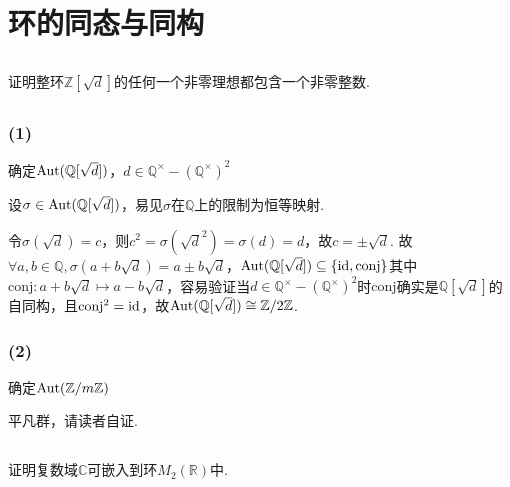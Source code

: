 \section{环的同态与同构}
\subsection{}
证明整环$\mathbb{Z}[\sqrt{d}]$的任何一个非零理想都包含一个非零整数.


\subsection{}
\subsubsection{(1)}
确定$\operatorname{Aut}(\mathbb{Q}[\sqrt{d}])$，$d\in\mathbb{Q}^{\times}-(\mathbb{Q}^{\times})^2$

\jie 设$\sigma\in\operatorname{Aut}(\mathbb{Q}[\sqrt{d}])$，易见$\sigma$在$\mathbb{Q}$上的限制为恒等映射.

令$\sigma(\sqrt{d})=c$，则$c^2=\sigma(\sqrt{d}^2)=\sigma(d)=d$，故$c=\pm \sqrt{d}$. 故$\forall a,b\in\mathbb{Q}, \sigma(a+b\sqrt{d})=a\pm b\sqrt{d}$，$\operatorname{Aut}(\mathbb{Q}[\sqrt{d}])\subseteq\{\operatorname{id}, \mathrm{conj}\}$其中$\mathrm{conj}: a+b\sqrt{d}\mapsto a-b\sqrt{d}$，容易验证当$d\in\mathbb{Q}^{\times}-(\mathbb{Q}^{\times})^2$时$\mathrm{conj}$确实是$\mathbb{Q}[\sqrt{d}]$的自同构，且$\mathrm{conj}^2=\operatorname{id}$，故$\operatorname{Aut}(\mathbb{Q}[\sqrt{d}])\cong\mathbb{Z}/2\mathbb{Z}$.

\subsubsection{(2)}
确定$\operatorname{Aut}(\mathbb{Z}/m\mathbb{Z})$

\jie 平凡群，请读者自证.

\subsection{}
证明复数域$\mathbb{C}$可嵌入到环$M_2(\mathbb{R})$中.


